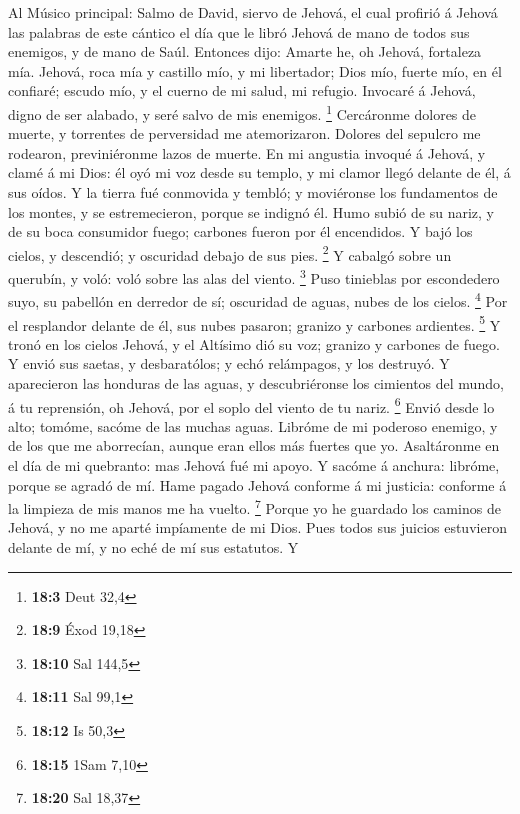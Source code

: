  Al Músico principal: Salmo de David, siervo de Jehová, el
cual profirió á Jehová las palabras de este cántico el día que le libró
Jehová de mano de todos sus enemigos, y de mano de Saúl. Entonces dijo:
Amarte he, oh Jehová, fortaleza mía.  Jehová, roca mía y
castillo mío, y mi libertador; Dios mío, fuerte mío, en él confiaré;
escudo mío, y el cuerno de mi salud, mi refugio.  Invocaré á
Jehová, digno de ser alabado, y seré salvo de mis enemigos. \footnote{\textbf{18:3}
  Deut 32,4}  Cercáronme dolores de muerte, y torrentes de
perversidad me atemorizaron.  Dolores del sepulcro me
rodearon, previniéronme lazos de muerte.  En mi angustia
invoqué á Jehová, y clamé á mi Dios: él oyó mi voz desde su templo, y mi
clamor llegó delante de él, á sus oídos.  Y la tierra fué
conmovida y tembló; y moviéronse los fundamentos de los montes, y se
estremecieron, porque se indignó él.  Humo subió de su
nariz, y de su boca consumidor fuego; carbones fueron por él encendidos.
 Y bajó los cielos, y descendió; y oscuridad debajo de sus
pies. \footnote{\textbf{18:9} Éxod 19,18}  Y cabalgó sobre
un querubín, y voló: voló sobre las alas del viento. \footnote{\textbf{18:10}
  Sal 144,5}  Puso tinieblas por escondedero suyo, su
pabellón en derredor de sí; oscuridad de aguas, nubes de los cielos.
\footnote{\textbf{18:11} Sal 99,1}  Por el resplandor
delante de él, sus nubes pasaron; granizo y carbones ardientes.
\footnote{\textbf{18:12} Is 50,3}  Y tronó en los cielos
Jehová, y el Altísimo dió su voz; granizo y carbones de fuego.
 Y envió sus saetas, y desbaratólos; y echó relámpagos, y
los destruyó.  Y aparecieron las honduras de las aguas, y
descubriéronse los cimientos del mundo, á tu reprensión, oh Jehová, por
el soplo del viento de tu nariz. \footnote{\textbf{18:15} 1Sam 7,10}
 Envió desde lo alto; tomóme, sacóme de las muchas aguas.
 Libróme de mi poderoso enemigo, y de los que me
aborrecían, aunque eran ellos más fuertes que yo. 
Asaltáronme en el día de mi quebranto: mas Jehová fué mi apoyo.
 Y sacóme á anchura: libróme, porque se agradó de mí.
 Hame pagado Jehová conforme á mi justicia: conforme á la
limpieza de mis manos me ha vuelto. \footnote{\textbf{18:20} Sal 18,37}
 Porque yo he guardado los caminos de Jehová, y no me
aparté impíamente de mi Dios.  Pues todos sus juicios
estuvieron delante de mí, y no eché de mí sus estatutos.  Y
